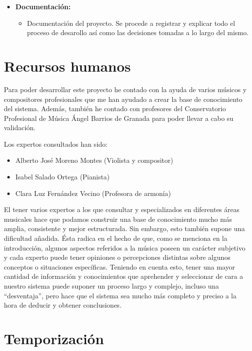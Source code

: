 \bigskip

\begin{itemize}
	\item \textbf{Documentación:}
	\begin{itemize}
		\item Documentación del proyecto. Se procede a registrar y explicar todo el proceso de desarollo así como las decisiones tomadas a lo largo del mismo.
	\end{itemize}
\end{itemize}

\section{Recursos humanos}

Para poder desarrollar este proyecto he contado con la ayuda de varios músicos y compositores profesionales que me han ayudado a crear la base de conocimiento del sistema. Además, también he contado con profesores del Conservatorio Profesional de Música Ángel Barrios de Granada para poder llevar a cabo su validación.

Los expertos consultados han sido:

\begin{itemize}
	\item Alberto José Moreno Montes (Violista y compositor)
	\item Isabel Salado Ortega (Pianista)
	\item Clara Luz Fernández Vecino (Profesora de armonía)
\end{itemize}

El tener varios expertos a los que consultar y especializados en diferentes áreas musicales hace que podamos construir una base de conocimiento mucho más amplia, consistente y mejor estructurada. Sin embargo, esto también supone una dificultad añadida. Ésta radica en el hecho de que, como se menciona en la introducción, algunos aspectos referidos a la música poseen un carácter subjetivo y cada experto puede tener opiniones o percepciones distintas sobre algunos conceptos o situaciones específicas. Teniendo en cuenta esto, tener una mayor cantidad de información y conocimientos que aprehender y seleccionar de cara a nuestro sistema puede suponer un proceso largo y complejo, incluso una ``desventaja'', pero hace que el sistema sea mucho más completo y preciso a la hora de deducir y obtener conclusiones.

\section{Temporización}

